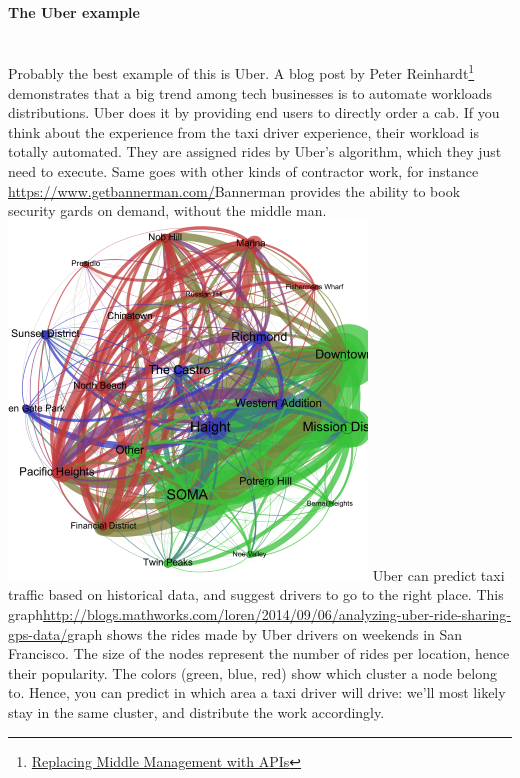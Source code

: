 \documentclass[12pt]{article}
\begin{document}
\paragraph{The Uber example}
\\

Probably the best example of this is Uber. A blog post by Peter Reinhardt\footnote{\href{http://rein.pk/replacing-middle-management-with-apis/}{Replacing Middle Management with APIs}} demonstrates that a big trend among tech businesses is to automate workloads distributions. Uber does it by providing end users to directly order a cab. If you think about the experience from the taxi driver experience, their workload is totally automated. They are assigned rides by Uber's algorithm, which they just need to execute. Same goes with other kinds of contractor work, for instance \url{https://www.getbannerman.com/}{Bannerman} provides the ability to book security gards on demand, without the middle man. 
\vspace{5mm}
\\
\includegraphics[width=\textwidth]{uber-graph}
Uber can predict taxi traffic based on historical data, and suggest drivers to go to the right place. This graph\url{http://blogs.mathworks.com/loren/2014/09/06/analyzing-uber-ride-sharing-gps-data/}{graph} shows the rides made by Uber drivers on weekends in San Francisco. 
The size of the nodes represent the number of rides per location, hence their popularity. 
The colors (green, blue, red) show which cluster a node belong to. Hence, you can predict in which area a taxi driver will drive: we'll most likely stay in the same cluster, and distribute the work accordingly.
\\
\end{document}
